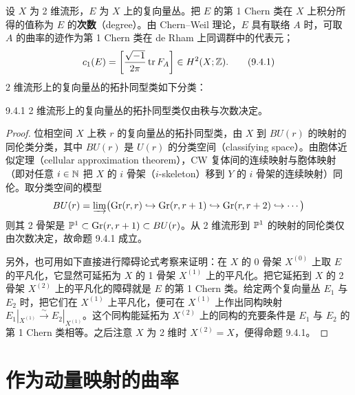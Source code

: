 设 $X$ 为 2 维流形，$E$ 为 $X$ 上的复向量丛。把 $E$ 的第 1 Chern 类在 $X$ 上积分所得的值称为 $E$ 的\textbf{次数}（degree）。由 Chern--Weil 理论，$E$ 具有联络 $A$ 时，可取 $A$ 的曲率的迹作为第 1 Chern 类在 de Rham 上同调群中的代表元；
\begin{equation}
  c_1(E) = \left[\frac{\sqrt{-1}}{2\pi}\operatorname{tr} F_A\right] \in H^2(X;\mathbb{Z}).
  \tag{9.4.1}
\end{equation}
2 维流形上的复向量丛的拓扑同型类如下分类：

\begin{proposition*}{9.4.1}
2 维流形上的复向量丛的拓扑同型类仅由秩与次数决定。
\end{proposition*}

\begin{proof}
位相空间 $X$ 上秩 $r$ 的复向量丛的拓扑同型类，由 $X$ 到 $BU(r)$ 的映射的同伦类分类，其中 $BU(r)$ 是 $U(r)$ 的分类空间（classifying space）。由胞体近似定理（cellular approximation theorem），CW 复体间的连续映射与胞体映射（即对任意 $i\in\mathbb{N}$ 把 $X$ 的 $i$ 骨架（$i$-skeleton）移到 $Y$ 的 $i$ 骨架的连续映射）同伦。取分类空间的模型
\[
  BU(r) = \varinjlim\bigl(\mathrm{Gr}(r,r)\hookrightarrow \mathrm{Gr}(r,r+1)\hookrightarrow \mathrm{Gr}(r,r+2)\hookrightarrow\cdots\bigr)
\]
则其 2 骨架是 $\mathbb{P}^1\subset \mathrm{Gr}(r,r+1)\subset BU(r)$。从 2 维流形到 $\mathbb{P}^1$ 的映射的同伦类仅由次数决定，故命题 9.4.1 成立。

另外，也可用如下直接进行障碍论式考察来证明：在 $X$ 的 0 骨架 $X^{(0)}$ 上取 $E$ 的平凡化，它显然可延拓为 $X$ 的 1 骨架 $X^{(1)}$ 上的平凡化。把它延拓到 $X$ 的 2 骨架 $X^{(2)}$ 上的平凡化的障碍就是 $E$ 的第 1 Chern 类。给定两个复向量丛 $E_1$ 与 $E_2$ 时，把它们在 $X^{(1)}$ 上平凡化，便可在 $X^{(1)}$ 上作出同构映射 $E_1|_{X^{(1)}}\xrightarrow{\sim} E_2|_{X^{(1)}}$。这个同构能延拓为 $X^{(2)}$ 上的同构的充要条件是 $E_1$ 与 $E_2$ 的第 1 Chern 类相等。之后注意 $X$ 为 2 维时 $X^{(2)}=X$，便得命题 9.4.1。
\end{proof}



\section{作为动量映射的曲率}

